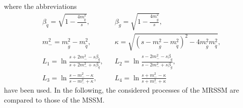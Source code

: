 where the abbreviations \cite{Beenakker:1996ch} 
\begin{align}
&\beta_{\tilde{q}} = \sqrt{1-\frac{4 m_{\tilde{q}}^2}{s}}, && \beta_{\tilde{g}} = \sqrt{1-\frac{4 m_{\tilde{g}}^2}{s}},\nonumber\\
&m_-^2 = m_{\tilde{g}}^2 - m_{\tilde{q}}^2, && \kappa = \sqrt{(s-m_{\tilde{g}}^2-m_{\tilde{q}}^2)^2-4m_{\tilde{g}}^2m_{\tilde{q}}^2},
\nonumber\\
& L_1 = \ln \frac{s+2m_-^2 - s\beta_{\tilde{q}}}{s+2m_-^2 + s\beta_{\tilde{q}}}, && L_2= \ln \frac{s - 2m_-^2 - s\beta_{\tilde{g}}}{s - 2m_-^2 + s\beta_{\tilde{g}}}, \nonumber\\
& L_3 = \ln \frac{s - m_-^2 - \kappa}{s - m_-^2 + \kappa}, && L_4= \ln \frac{s + m_-^2 - \kappa}{s + m_-^2 + \kappa}
\end{align}
have been used. In the following, the considered processes of the MRSSM are compared to those of the MSSM.

